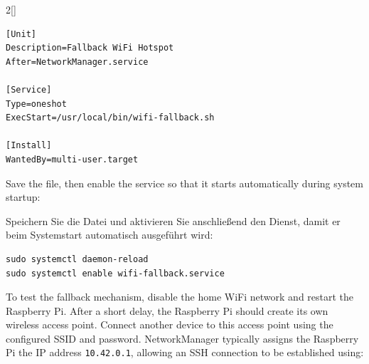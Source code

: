 \begin{paracol}{2}[]
\colende


\begin{lstlisting}[style=shell]
[Unit]
Description=Fallback WiFi Hotspot
After=NetworkManager.service

[Service]
Type=oneshot
ExecStart=/usr/local/bin/wifi-fallback.sh

[Install]
WantedBy=multi-user.target
\end{lstlisting}

\colstart

Save the file, then enable the service so that it starts automatically during system startup:

\colger

Speichern Sie die Datei und aktivieren Sie anschließend den Dienst, damit er beim Systemstart automatisch ausgeführt wird:

\colende


\begin{lstlisting}[style=shell]
sudo systemctl daemon-reload
sudo systemctl enable wifi-fallback.service
\end{lstlisting}

\renewcommand{\deutschertitel}{Schritt 3: Konfiguration der Rückfalllösung überprüfen}
\renewcommand{\englischertitel}{Step 3: Verify the Fallback Configuration}
\makrounterunterabschnitt

To test the fallback mechanism, disable the home WiFi network and restart the Raspberry Pi. After a short delay, the Raspberry Pi should create its own wireless access point. Connect another device to this access point using the configured SSID and password. NetworkManager typically assigns the Raspberry Pi the IP address \verb!10.42.0.1!, allowing an SSH connection to be established using:


\end{paracol}
